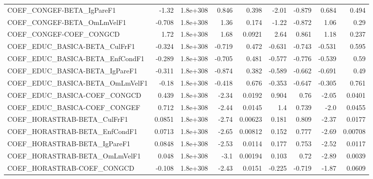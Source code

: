 \begin{tabular}{lrrrrrrrr}
COEF\_CONGEF-BETA\_IgPareF1             &       -1.32 &     1.8e+308 &   0.846 &    0.398 &      -2.01 &      -0.879 &        0.684 &         0.494 \\
COEF\_CONGEF-BETA\_OmLmVelF1            &      -0.708 &     1.8e+308 &    1.36 &    0.174 &      -1.22 &      -0.872 &         1.06 &          0.29 \\
COEF\_CONGEF-COEF\_CONGCD               &        1.72 &     1.8e+308 &    1.68 &   0.0921 &       2.64 &       0.861 &         1.18 &         0.237 \\
COEF\_EDUC\_BASICA-BETA\_CulFrF1         &      -0.324 &     1.8e+308 &  -0.719 &    0.472 &     -0.631 &      -0.743 &       -0.531 &         0.595 \\
COEF\_EDUC\_BASICA-BETA\_EnfCondF1       &      -0.289 &     1.8e+308 &  -0.705 &    0.481 &     -0.577 &      -0.776 &       -0.539 &          0.59 \\
COEF\_EDUC\_BASICA-BETA\_IgPareF1        &      -0.311 &     1.8e+308 &  -0.874 &    0.382 &     -0.589 &      -0.662 &       -0.691 &          0.49 \\
COEF\_EDUC\_BASICA-BETA\_OmLmVelF1       &       -0.18 &     1.8e+308 &  -0.418 &    0.676 &     -0.353 &      -0.647 &       -0.305 &         0.761 \\
COEF\_EDUC\_BASICA-COEF\_CONGCD          &       0.439 &     1.8e+308 &   -2.34 &   0.0192 &      0.904 &        0.76 &        -2.05 &        0.0401 \\
COEF\_EDUC\_BASICA-COEF\_CONGEF          &       0.712 &     1.8e+308 &   -2.44 &   0.0145 &        1.4 &       0.739 &         -2.0 &        0.0455 \\
COEF\_HORASTRAB-BETA\_CulFrF1           &      0.0851 &     1.8e+308 &   -2.74 &  0.00623 &      0.181 &       0.809 &        -2.37 &        0.0177 \\
COEF\_HORASTRAB-BETA\_EnfCondF1         &      0.0713 &     1.8e+308 &   -2.65 &  0.00812 &      0.152 &       0.777 &        -2.69 &       0.00708 \\
COEF\_HORASTRAB-BETA\_IgPareF1          &      0.0848 &     1.8e+308 &   -2.53 &   0.0114 &      0.177 &       0.753 &        -2.52 &        0.0117 \\
COEF\_HORASTRAB-BETA\_OmLmVelF1         &       0.048 &     1.8e+308 &    -3.1 &  0.00194 &      0.103 &        0.72 &        -2.89 &        0.0039 \\
COEF\_HORASTRAB-COEF\_CONGCD            &      -0.108 &     1.8e+308 &   -2.43 &   0.0151 &     -0.225 &      -0.719 &        -1.87 &        0.0609 \\

\end{tabular}
